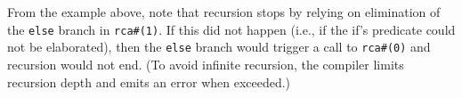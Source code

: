 From the example above, note that recursion stops by relying on elimination of the \verb|else| branch in \verb|rca#(1)|.
If this did not happen (i.e., if the if's predicate could not be elaborated),
then the \verb|else| branch would trigger a call to \verb|rca#(0)| and recursion would not end.
(To avoid infinite recursion, the compiler limits recursion depth and emits an error when exceeded.)

